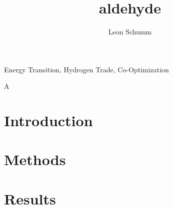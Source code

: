 \documentclass[5p]{elsarticle}
\begin{document}
\begin{frontmatter}

	\title{aldehyde}
    
	\author[tub, oth]{Leon Schumm}


	\address[tub]{Department of Digital Transformation in Energy Systems, Institute of Energy Technology, Technische Universität Berlin, Fakultät III, Einsteinufer 25 (TA 8), 10587 Berlin, Germany}
	\address[oth]{Research Center on Energy Transmission and Storage (FENES), Faculty of Electrical and Information Technology, University of Applied Sciences (OTH) Regensburg, Seybothstrasse 2, 93053 Regensburg, Germany}

	\begin{abstract}
		
	\end{abstract}

	\begin{keyword}
		Energy Transition, Hydrogen Trade, Co-Optimization
	\end{keyword}


	\begin{highlights}
		\item A
	\end{highlights}

\end{frontmatter}



\section{Introduction}
\label{sec:intro}



\section{Methods}
\label{sec:methods}



\section{Results}
\label{sec:results}
\end{document}
